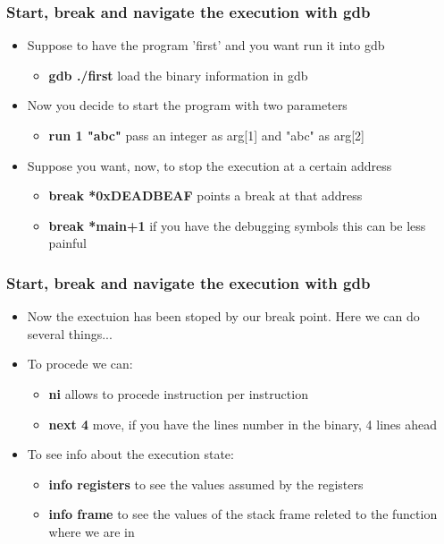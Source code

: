 \documentclass[]{beamer}
\begin{document}
      \begin{frame}
        \frametitle{Start, break and navigate the execution with gdb}
        \begin{itemize}
            \item{Suppose to have the program 'first' and you want run it into gdb }\\
            \begin{itemize}
                \item{{\bf gdb ./first} load the binary information in gdb}
            \end{itemize}
            \item{Now you decide to start the program with two parameters}\\
            \begin{itemize}
                \item{{\bf run 1 "abc"} pass an integer as arg[1] and "abc" as arg[2]}
            \end{itemize}
            \item{Suppose you want, now, to stop the execution at a certain address}\\
            \begin{itemize}
                \item{{\bf break *0xDEADBEAF} points a break at that address}
                \item{{\bf break *main+1} if you have the debugging symbols this can be less painful}
            \end{itemize}
        \end{itemize}
      \end{frame}
      \begin{frame}
        \frametitle{Start, break and navigate the execution with gdb}
        \begin{itemize}
            \item{Now the exectuion has been stoped by our break point. Here we can do several things...}
            \item{To procede we can:}
            \begin{itemize}
                \item{{\bf ni} allows to procede instruction per instruction}
                \item{{\bf next 4} move, if you have the lines number in the binary, 4 lines ahead}
            \end{itemize}
            \item{To see info about the execution state:}
            \begin{itemize}
                \item{{\bf info registers} to see the values assumed by the registers}
                \item{{\bf info frame} to see the values of the stack frame releted to the function where we are in}
            \end{itemize}
        \end{itemize}
      \end{frame}
\end{document}
